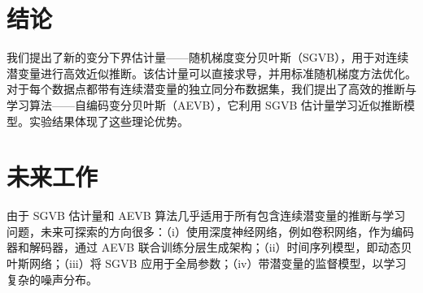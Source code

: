 \section{结论}
我们提出了新的变分下界估计量——随机梯度变分贝叶斯（SGVB），用于对连续潜变量进行高效近似推断。该估计量可以直接求导，并用标准随机梯度方法优化。对于每个数据点都带有连续潜变量的独立同分布数据集，我们提出了高效的推断与学习算法——自编码变分贝叶斯（AEVB），它利用 SGVB 估计量学习近似推断模型。实验结果体现了这些理论优势。

\section{未来工作}
由于 SGVB 估计量和 AEVB 算法几乎适用于所有包含连续潜变量的推断与学习问题，未来可探索的方向很多：（i）使用深度神经网络，例如卷积网络，作为编码器和解码器，通过 AEVB 联合训练分层生成架构；（ii）时间序列模型，即动态贝叶斯网络；（iii）将 SGVB 应用于全局参数；（iv）带潜变量的监督模型，以学习复杂的噪声分布。

